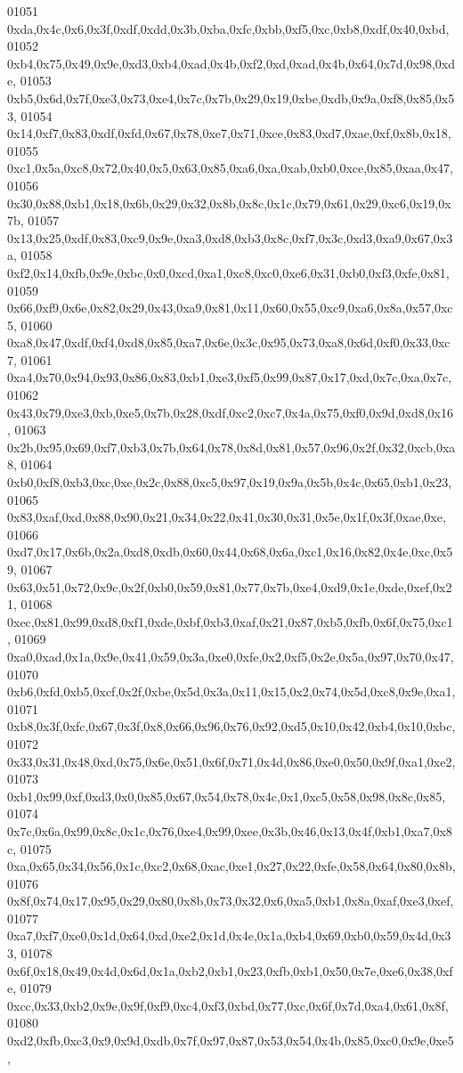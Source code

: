 \begin{DoxyCode}
01051   0xda,0x4c,0x6,0x3f,0xdf,0xdd,0x3b,0xba,0xfc,0xbb,0xf5,0xc,0xb8,0xdf,0x40,0xbd,
01052   0xb4,0x75,0x49,0x9e,0xd3,0xb4,0xad,0x4b,0xf2,0xd,0xad,0x4b,0x64,0x7d,0x98,0xde,
01053   0xb5,0x6d,0x7f,0xe3,0x73,0xe4,0x7c,0x7b,0x29,0x19,0xbe,0xdb,0x9a,0xf8,0x85,0x53,
01054   0x14,0xf7,0x83,0xdf,0xfd,0x67,0x78,0xe7,0x71,0xce,0x83,0xd7,0xae,0xf,0x8b,0x18,
01055   0xc1,0x5a,0xc8,0x72,0x40,0x5,0x63,0x85,0xa6,0xa,0xab,0xb0,0xce,0x85,0xaa,0x47,
01056   0x30,0x88,0xb1,0x18,0x6b,0x29,0x32,0x8b,0x8c,0x1c,0x79,0x61,0x29,0xc6,0x19,0x7b,
01057   0x13,0x25,0xdf,0x83,0xc9,0x9e,0xa3,0xd8,0xb3,0x8c,0xf7,0x3c,0xd3,0xa9,0x67,0x3a,
01058   0xf2,0x14,0xfb,0x9e,0xbc,0x0,0xcd,0xa1,0xc8,0xc0,0xe6,0x31,0xb0,0xf3,0xfe,0x81,
01059   0x66,0xf9,0x6e,0x82,0x29,0x43,0xa9,0x81,0x11,0x60,0x55,0xc9,0xa6,0x8a,0x57,0xc5,
01060   0xa8,0x47,0xdf,0xf4,0xd8,0x85,0xa7,0x6e,0x3c,0x95,0x73,0xa8,0x6d,0xf0,0x33,0xc7,
01061   0xa4,0x70,0x94,0x93,0x86,0x83,0xb1,0xe3,0xf5,0x99,0x87,0x17,0xd,0x7c,0xa,0x7c,
01062   0x43,0x79,0xe3,0xb,0xe5,0x7b,0x28,0xdf,0xc2,0xc7,0x4a,0x75,0xf0,0x9d,0xd8,0x16,
01063   0x2b,0x95,0x69,0xf7,0xb3,0x7b,0x64,0x78,0x8d,0x81,0x57,0x96,0x2f,0x32,0xcb,0xa8,
01064   0xb0,0xf8,0xb3,0xc,0xe,0x2c,0x88,0xc5,0x97,0x19,0x9a,0x5b,0x4c,0x65,0xb1,0x23,
01065   0x83,0xaf,0xd,0x88,0x90,0x21,0x34,0x22,0x41,0x30,0x31,0x5e,0x1f,0x3f,0xae,0xe,
01066   0xd7,0x17,0x6b,0x2a,0xd8,0xdb,0x60,0x44,0x68,0x6a,0xc1,0x16,0x82,0x4e,0xc,0x59,
01067   0x63,0x51,0x72,0x9c,0x2f,0xb0,0x59,0x81,0x77,0x7b,0xe4,0xd9,0x1e,0xde,0xef,0x21,
01068   0xec,0x81,0x99,0xd8,0xf1,0xde,0xbf,0xb3,0xaf,0x21,0x87,0xb5,0xfb,0x6f,0x75,0xc1,
01069   0xa0,0xad,0x1a,0x9e,0x41,0x59,0x3a,0xe0,0xfe,0x2,0xf5,0x2e,0x5a,0x97,0x70,0x47,
01070   0xb6,0xfd,0xb5,0xcf,0x2f,0xbe,0x5d,0x3a,0x11,0x15,0x2,0x74,0x5d,0xc8,0x9e,0xa1,
01071   0xb8,0x3f,0xfc,0x67,0x3f,0x8,0x66,0x96,0x76,0x92,0xd5,0x10,0x42,0xb4,0x10,0xbc,
01072   0x33,0x31,0x48,0xd,0x75,0x6e,0x51,0x6f,0x71,0x4d,0x86,0xe0,0x50,0x9f,0xa1,0xe2,
01073   0xb1,0x99,0xf,0xd3,0x0,0x85,0x67,0x54,0x78,0x4c,0x1,0xc5,0x58,0x98,0x8c,0x85,
01074   0x7c,0x6a,0x99,0x8c,0x1c,0x76,0xe4,0x99,0xee,0x3b,0x46,0x13,0x4f,0xb1,0xa7,0x8c,
01075   0xa,0x65,0x34,0x56,0x1c,0xc2,0x68,0xac,0xe1,0x27,0x22,0xfe,0x58,0x64,0x80,0x8b,
01076   0x8f,0x74,0x17,0x95,0x29,0x80,0x8b,0x73,0x32,0x6,0xa5,0xb1,0x8a,0xaf,0xe3,0xef,
01077   0xa7,0xf7,0xe0,0x1d,0x64,0xd,0xe2,0x1d,0x4e,0x1a,0xb4,0x69,0xb0,0x59,0x4d,0x33,
01078   0x6f,0x18,0x49,0x4d,0x6d,0x1a,0xb2,0xb1,0x23,0xfb,0xb1,0x50,0x7e,0xe6,0x38,0xfe,
01079   0xcc,0x33,0xb2,0x9e,0x9f,0xf9,0xc4,0xf3,0xbd,0x77,0xc,0x6f,0x7d,0xa4,0x61,0x8f,
01080   0xd2,0xfb,0xc3,0x9,0x9d,0xdb,0x7f,0x97,0x87,0x53,0x54,0x4b,0x85,0xc0,0x9e,0xe5,

\end{DoxyCode}
